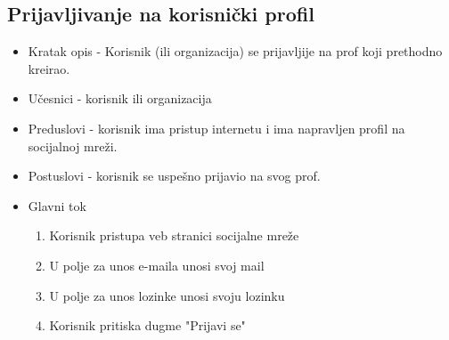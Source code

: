 \subsection{Prijavljivanje na korisnički profil}
\begin{itemize}
	\item Kratak opis - Korisnik (ili organizacija) se prijavljije na prof koji prethodno kreirao.
	\item Učesnici - korisnik ili organizacija
	\item Preduslovi - korisnik ima pristup internetu i ima napravljen profil na socijalnoj mreži.
	\item Postuslovi - korisnik se uspešno prijavio na svog prof.
	\item Glavni tok
		\begin{enumerate}
			\item Korisnik pristupa veb stranici socijalne mreže
			\item U polje za unos e-maila unosi svoj mail
			\item U polje za unos lozinke unosi svoju lozinku
			\item Korisnik pritiska dugme "Prijavi se" 
		\end{enumerate}
\end{itemize}
